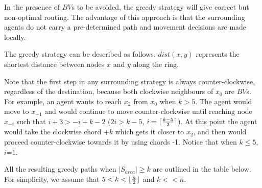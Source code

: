   
In the presence of $BV$s to be avoided, the greedy strategy will give correct but non-optimal routing. 
The advantage of this approach is that the surrounding 
agents do not carry a pre-determined path  and movement decisions are made locally.
 

 The greedy strategy can be described as follows. $dist(x,y)$ represents the shortest distance between nodes  $x$ and $y$ along the ring.\\


\begin{center}
\end{center}
 
Note that the first step in any surrounding strategy is  always counter-clockwise, regardless of the destination, because both clockwise neighbours of $x_0$ are $BV$s. For example, an agent wants to reach $x_2$ from $x_0$ when $k>5$.  The agent would move to $x_{-1}$ and would continue to move counter-clockwise until reaching node $x_{-i}$ such that $i+3> -i+k-2$ ($2i>k-5$, $i =  \lceil{{ k-5} \over 2}\rceil$).
At this point the agent would take the clockwise chord $+k$ which gets it closer to $x_2$, and then would proceed counter-clockwise towards it by using chords -1. Notice that when $k\leq5$, $i$=1.

\noindent All the resulting greedy paths when  $\left\vert{S_{area}}\right\vert \ge k$ are outlined in the table below. For simplicity, we assume that $5<k<\lfloor {n \over 2} \rfloor$ and $k<<n$.

